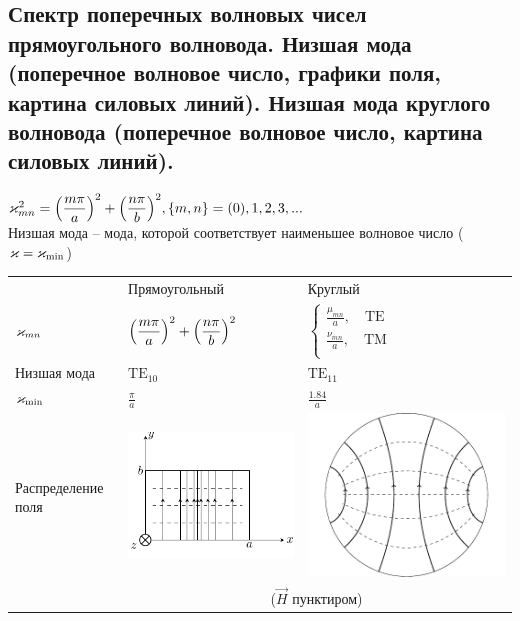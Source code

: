 \begin{multicols*}{2}
		\section{Спектр поперечных волновых чисел прямоугольного волновода. Низшая мода (поперечное волновое число, графики поля, картина силовых линий). Низшая мода круглого волновода (поперечное волновое число, картина силовых линий).}
		
		$\varkappa_{mn}^2=\qty(\dfrac{m\pi}{a})^2+\qty(\dfrac{n\pi}{b})^2, \{m,n\} = (0),1,2,3,...$ \\
		Низшая мода – мода, которой соответствует наименьшее волновое число ($\varkappa=\varkappa_\text{min}$) \\
		
		\begin{tabular}{*{3}{l}}
			{} & {Прямоугольный} & {Круглый} \\
			
			{$\varkappa_{mn}$} &
			{$\qty(\dfrac{m\pi}{a})^2+\qty(\dfrac{n\pi}{b})^2$} &
			{$\begin{cases}
					\frac{\mu_{mn}}{a}, \quad \text{TE} \\
					\frac{\nu_{mn}}{a}, \quad \text{TM}\\
				\end{cases}$} \\
			
			{Низшая мода} & {$\text{TE}_{10}$} & {$\text{TE}_{11}$} \\
			
			{$\varkappa_\text{min}$} & {$\frac \pi a$} & {$\frac {1.84}{a}$} \\
			
			{Распределение поля} &
			{\includegraphics[width=0.25\linewidth]{aed_imgs/lect4_ris8} } &
			{\includegraphics[width=0.25\linewidth]{aed_imgs/lect5_cylindric_TE11}}\\
			{} & \multicolumn{2}{c}{($\vec{H}$ пунктиром)} \\
		\end{tabular}
		

\end{multicols*}
